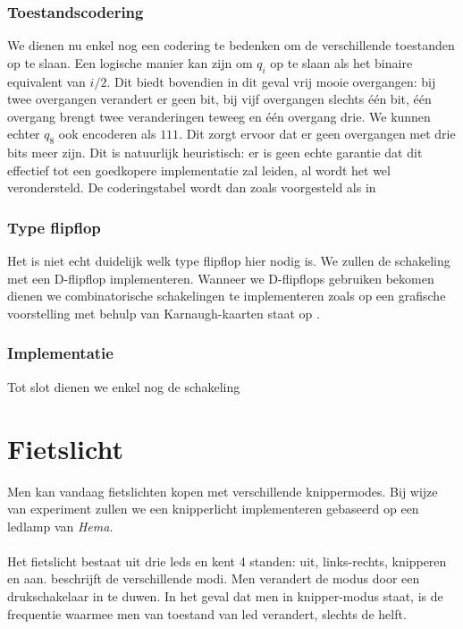 \subsubsection{Toestandscodering}
We dienen nu enkel nog een codering te bedenken om de verschillende toestanden op te slaan. Een logische manier kan zijn om $q_i$ op te slaan als het binaire equivalent van $i/2$. Dit biedt bovendien in dit geval vrij mooie overgangen: bij twee overgangen verandert er geen bit, bij vijf overgangen slechts \'e\'en bit, \'e\'en overgang brengt twee veranderingen teweeg en \'e\'en overgang drie. We kunnen echter $q_8$ ook encoderen als $111$. Dit zorgt ervoor dat er geen overgangen met drie bits meer zijn. Dit is natuurlijk heuristisch: er is geen echte garantie dat dit effectief tot een goedkopere implementatie zal leiden, al wordt het wel verondersteld. De coderingstabel wordt dan zoals voorgesteld als in 
\subsubsection{Type flipflop}
Het is niet echt duidelijk welk type flipflop hier nodig is. We zullen de schakeling met een D-flipflop implementeren.
Wanneer we D-flipflops gebruiken bekomen dienen we combinatorische schakelingen te implementeren zoals op  een grafische voorstelling met behulp van Karnaugh-kaarten staat op .
\subsubsection{Implementatie}
Tot slot dienen we enkel nog de schakeling 
\section{Fietslicht}
Men kan vandaag fietslichten kopen met verschillende knippermodes. Bij wijze van experiment zullen we een knipperlicht implementeren gebaseerd op een ledlamp van \emph{Hema}.
\paragraph{}
Het fietslicht bestaat uit drie leds en kent 4 standen: uit, links-rechts, knipperen en aan.  beschrijft de verschillende modi. Men verandert de modus door een drukschakelaar in te duwen. In het geval dat men in knipper-modus staat, is de frequentie waarmee men van toestand van led verandert, slechts de helft.
